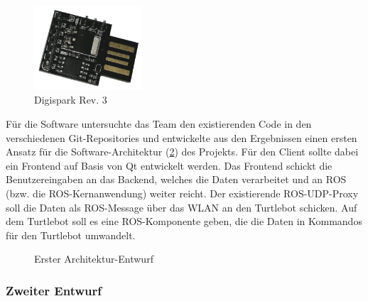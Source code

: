 \documentclass[a4paper,12pt,headsepline]{scrartcl}
\begin{document}
		\begin{figure}[H]
			\centering
			\includegraphics[width=4cm]{Images/digispark.png}
			\caption{Digispark Rev. 3}
			\label{fig:digispark}
		\end{figure}

		Für die Software untersuchte das Team den existierenden Code in den verschiedenen Git-Repositories und entwickelte aus den Ergebnissen einen ersten Ansatz für die Software-Architektur (\cref{fig:arch01}) des Projekts. Für den Client sollte dabei ein Frontend auf Basis von Qt entwickelt werden. Das Frontend schickt die Benutzereingaben an das Backend, welches die Daten verarbeitet und an ROS (bzw. die ROS-Kernanwendung) weiter reicht. Der existierende ROS-UDP-Proxy soll die Daten als ROS-Message über das WLAN an den Turtlebot schicken. Auf dem Turtlebot soll es eine ROS-Komponente geben, die die Daten in Kommandos für den Turtlebot umwandelt. 
		\begin{figure}[H]
			\centering
			\resizebox{\textwidth}{!}{}
			\caption{Erster Architektur-Entwurf}
			\label{fig:arch01}
		\end{figure}

	\subsubsection{Zweiter Entwurf} \label{sec:entwurf2}
\end{document}
